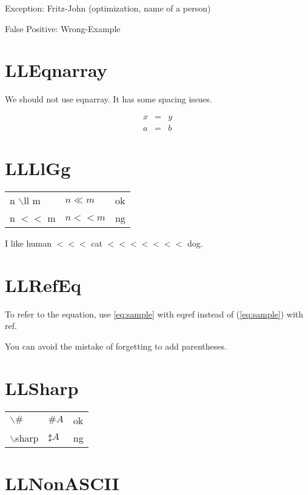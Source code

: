 \documentclass[a4paper, 10pt]{article}
\newcommand{\tA}[1]{\textcolor{cA}{#1}}
\newcommand{\tD}[1]{\textcolor{cD}{#1}}
\begin{document}
Exception: Fritz-John (optimization, name of a person)

False Positive: Wrong-Example

\section{LLEqnarray}

We should not use eqnarray. It has some spacing issues.

\begin{eqnarray}
	x & = & y \\
	a & = & b
\end{eqnarray}

\section{LLLlGg}

\begin{table}[H]
	\centering
	\begin{tabular}{lll}
		n $\backslash$ll m & $n \ll m$ & \tA{ok} \\
		n $<<$ m           & $n<<m$    & \tD{ng} \\
	\end{tabular}
\end{table}

I like human $<<<$ cat $<<<<<<<$ dog.

\section{LLRefEq}

To refer to the equation, use \eqref{eq:sample} with eqref instead of (\ref{eq:sample}) with ref.

You can avoid the mistake of forgetting to add parentheses.

\section{LLSharp}

\begin{table}[H]
	\centering
	\begin{tabular}{lll}
		$\backslash\#$    & $\#A$      & \tA{ok} \\
		$\backslash$sharp & $\sharp A$ & \tD{ng}
	\end{tabular}
\end{table}

\section{LLNonASCII}
\end{document}
